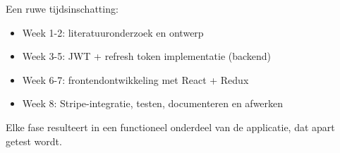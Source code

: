 Een ruwe tijdsinschatting:

\begin{itemize}
  \item Week 1-2: literatuuronderzoek en ontwerp
  \item Week 3-5: JWT + refresh token implementatie (backend)
  \item Week 6-7: frontendontwikkeling met React + Redux
  \item Week 8: Stripe-integratie, testen, documenteren en afwerken
\end{itemize}

Elke fase resulteert in een functioneel onderdeel van de applicatie, dat apart getest wordt.






